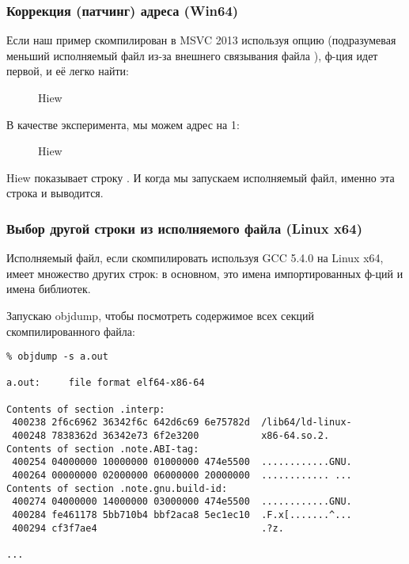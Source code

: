 \subsubsection{Коррекция (патчинг) адреса (Win64)}

Если наш пример скомпилирован в MSVC 2013 используя опцию 
(подразумевая меньший исполняемый файл из-за внешнего связывания файла ),
ф-ция \main идет первой, и её легко найти:

\begin{figure}[H]
\centering
{}
\caption{Hiew}
\label{}
\end{figure}

В качестве эксперимента, мы можем  адрес на 1:

\begin{figure}[H]
\centering
{}
\caption{Hiew}
\label{}
\end{figure}

Hiew показывает строку .
И когда мы запускаем исполняемый файл, именно эта строка и выводится.

\subsubsection{Выбор другой строки из исполняемого файла (Linux x64)}

Исполняемый файл, если скомпилировать используя GCC 5.4.0 на Linux x64, имеет множество других строк:
в основном, это имена импортированных ф-ций и имена библиотек.

Запускаю objdump, чтобы посмотреть содержимое всех секций скомпилированного файла:

\begin{lstlisting}
% objdump -s a.out

a.out:     file format elf64-x86-64

Contents of section .interp:
 400238 2f6c6962 36342f6c 642d6c69 6e75782d  /lib64/ld-linux-
 400248 7838362d 36342e73 6f2e3200           x86-64.so.2.
Contents of section .note.ABI-tag:
 400254 04000000 10000000 01000000 474e5500  ............GNU.
 400264 00000000 02000000 06000000 20000000  ............ ...
Contents of section .note.gnu.build-id:
 400274 04000000 14000000 03000000 474e5500  ............GNU.
 400284 fe461178 5bb710b4 bbf2aca8 5ec1ec10  .F.x[.......^...
 400294 cf3f7ae4                             .?z.

...
\end{lstlisting}

